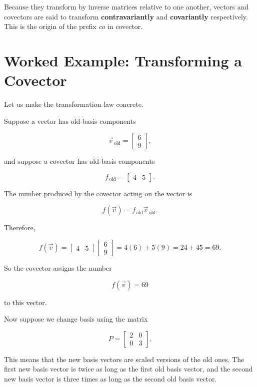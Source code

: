 \documentclass[11pt,openany]{book}
\theoremstyle{definition}
\begin{document}
Because they transform by inverse matrices relative to one another, vectors and
covectors are said to transform \textbf{contravariantly} and \textbf{covariantly}
respectively. This is the origin of the prefix \textit{co} in covector.

\section{Worked Example: Transforming a Covector}

Let us make the transformation law concrete.

Suppose a vector has old-basis components

\[
\vec{v}_{\,\text{old}}
=
\begin{bmatrix}
6 \\
9
\end{bmatrix},
\]

and suppose a covector has old-basis components

\[
f_{\,\text{old}}
=
\begin{bmatrix}
4 & 5
\end{bmatrix}.
\]

The number produced by the covector acting on the vector is

\[
f(\vec{v})
=
f_{\,\text{old}}\vec{v}_{\,\text{old}}.
\]

Therefore,

\[
f(\vec{v})
=
\begin{bmatrix}
4 & 5
\end{bmatrix}
\begin{bmatrix}
6 \\
9
\end{bmatrix}
=
4(6)+5(9)
=
24+45
=
69.
\]

So the covector assigns the number

\[
f(\vec{v}) = 69
\]

to this vector.

\medskip

Now suppose we change basis using the matrix

\[
P =
\begin{bmatrix}
2 & 0 \\
0 & 3
\end{bmatrix}.
\]

This means that the new basis vectors are scaled versions of the old ones. The
first new basis vector is twice as long as the first old basis vector, and the
second new basis vector is three times as long as the second old basis vector.
\end{document}
